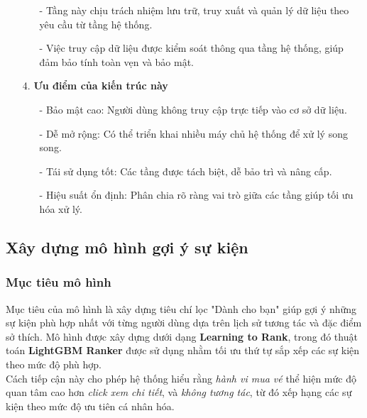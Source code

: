 \begin{itemize}
\begin{itemize}
        \item[-] Tầng này chịu trách nhiệm lưu trữ, truy xuất và quản lý dữ liệu theo yêu cầu từ tầng hệ thống.
        \item[-] Việc truy cập dữ liệu được kiểm soát thông qua tầng hệ thống, giúp đảm bảo tính toàn vẹn và bảo mật.
    \end{itemize}
    \item[4.] \textbf{Ưu điểm của kiến trúc này}
    \begin{itemize}
        \item[-] Bảo mật cao: Người dùng không truy cập trực tiếp vào cơ sở dữ liệu.
        \item[-] Dễ mở rộng: Có thể triển khai nhiều máy chủ hệ thống để xử lý song song.
        \item[-] Tái sử dụng tốt: Các tầng được tách biệt, dễ bảo trì và nâng cấp.
        \item[-] Hiệu suất ổn định: Phân chia rõ ràng vai trò giữa các tầng giúp tối ưu hóa xử lý.
    \end{itemize}
\end{itemize}
\subsection{Xây dựng mô hình gợi ý sự kiện}
\subsubsection{Mục tiêu mô hình}
\indent \indent Mục tiêu của mô hình là xây dựng tiêu chí lọc "Dành cho bạn" giúp gợi ý những sự kiện phù hợp nhất với từng người dùng dựa trên lịch sử tương tác và đặc điểm sở thích. Mô hình được xây dựng dưới dạng \textbf{Learning to Rank}, trong đó thuật toán \textbf{LightGBM Ranker} được sử dụng nhằm tối ưu thứ tự sắp xếp các sự kiện theo mức độ phù hợp.\\
\indent Cách tiếp cận này cho phép hệ thống hiểu rằng \textit{hành vi mua vé} thể hiện mức độ quan tâm cao hơn \textit{click xem chi tiết}, và \textit{không tương tác}, từ đó xếp hạng các sự kiện theo mức độ ưu tiên cá nhân hóa.
